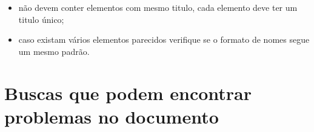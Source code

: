 \begin{itemize}
    \item não devem conter elementos com mesmo titulo, cada elemento deve ter um titulo único;
    
    \item caso existam vários elementos parecidos verifique se o formato de nomes segue um mesmo padrão.
    
\end{itemize}

\section{Buscas que podem encontrar problemas no documento}
\label{buscas-documento}

